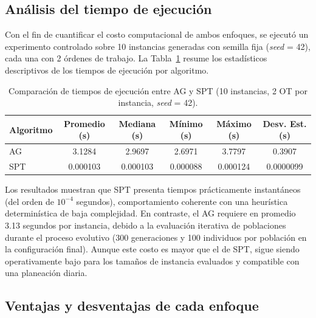 \subsection{Análisis del tiempo de ejecución}

Con el fin de cuantificar el costo computacional de ambos enfoques, se ejecutó un experimento
controlado sobre 10 instancias generadas con semilla fija (\textit{seed} = 42), cada una con
2 órdenes de trabajo. La Tabla~\ref{tab:tiempos_ejecucion} resume los estadísticos descriptivos
de los tiempos de ejecución por algoritmo.

\begin{table}[H]
\centering
\caption{Comparación de tiempos de ejecución entre AG y SPT (10 instancias, 2 OT por instancia, \textit{seed} = 42).}
\label{tab:tiempos_ejecucion}
\begin{tabular}{lccccc}
\toprule
Algoritmo & Promedio (s) & Mediana (s) & Mínimo (s) & Máximo (s) & Desv. Est. (s) \\
\midrule
AG  & 3.1284 & 2.9697 & 2.6971 & 3.7797 & 0.3907 \\
SPT & 0.000103 & 0.000103 & 0.000088 & 0.000124 & 0.0000099 \\
\bottomrule
\end{tabular}
\end{table}

Los resultados muestran que SPT presenta tiempos prácticamente instantáneos (del orden de
\(10^{-4}\) segundos), comportamiento coherente con una heurística determinística de baja complejidad.
En contraste, el AG requiere en promedio 3.13 segundos por instancia, debido a la evaluación
iterativa de poblaciones durante el proceso evolutivo (300 generaciones y 100 individuos por
población en la configuración final). Aunque este costo es mayor que el de SPT, sigue siendo
operativamente bajo para los tamaños de instancia evaluados y compatible con una planeación diaria.

\subsection{Ventajas y desventajas de cada enfoque}

